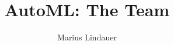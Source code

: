 




\title[AutoML: The Team]{AutoML: The Team}
\author{Marius Lindauer}
\date{}





	
	\maketitle
	

